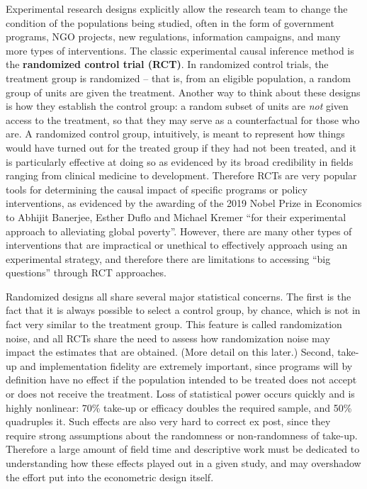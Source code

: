 Experimental research designs explicitly allow the research team
to change the condition of the populations being studied,
often in the form of government programs, NGO projects, new regulations,
information campaigns, and many more types of interventions.\cite{banerjee2009experimental}
The classic experimental causal inference method
is the \textbf{randomized control trial (RCT)}.
In randomized control trials, the treatment group is randomized --
that is, from an eligible population,
a random group of units are given the treatment.
Another way to think about these designs is how they establish the control group:
a random subset of units are \textit{not} given access to the treatment,
so that they may serve as a counterfactual for those who are.
A randomized control group, intuitively, is meant to represent
how things would have turned out for the treated group
if they had not been treated, and it is particularly effective at doing so
as evidenced by its broad credibility in fields ranging from clinical medicine to development.
Therefore RCTs are very popular tools for determining the causal impact
of specific programs or policy interventions, 
as evidenced by the awarding of the 2019 Nobel Prize in Economics
to Abhijit Banerjee, Esther Duflo and Michael Kremer 
“for their experimental approach to alleviating global poverty”.\cite{nobel2019}
However, there are many other types of interventions that are impractical or unethical
to effectively approach using an experimental strategy,
and therefore there are limitations to accessing ``big questions''
through RCT approaches.\cite{deaton2009}

Randomized designs all share several major statistical concerns.
The first is the fact that it is always possible to select a control group,
by chance, which is not in fact very similar to the treatment group.
This feature is called randomization noise, and all RCTs share the need to assess
how randomization noise may impact the estimates that are obtained.
(More detail on this later.)
Second, take-up and implementation fidelity are extremely important,
since programs will by definition have no effect
if the population intended to be treated
does not accept or does not receive the treatment.
Loss of statistical power occurs quickly and is highly nonlinear:
70\% take-up or efficacy doubles the required sample, and 50\% quadruples it.
Such effects are also very hard to correct ex post,
since they require strong assumptions about the randomness or non-randomness of take-up.
Therefore a large amount of field time and descriptive work
must be dedicated to understanding how these effects played out in a given study,
and may overshadow the effort put into the econometric design itself.

